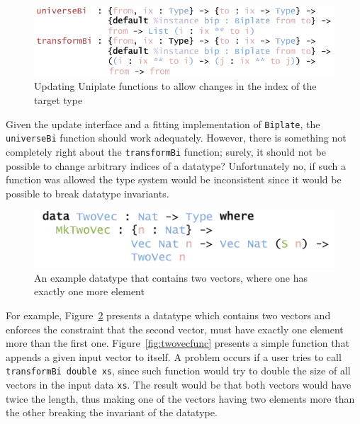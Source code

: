 \documentclass{ituthesis}
\newcommand{\tttype}[1]{\textcolor{type-color}{\texttt{#1}}}
\newcommand{\ttdec}[1]{\textcolor{declared-var-color}{\texttt{#1}}}
\newcommand{\ttvar}[1]{\textcolor{local-var-color}{\texttt{#1}}}
\theoremstyle{break}
\begin{document}
\begin{figure}[ht]
\begin{center}
    \includegraphics[scale=0.5]{Figures/UniplateFunctionsImproved.png}
\end{center}
\caption{Updating Uniplate functions to allow changes in the index of the target type}
\label{fig:uniplatefuncimp}
\end{figure}

Given the update interface and a fitting implementation of \tttype{Biplate}, the \ttdec{universeBi} function should work adequately.
However, there is something not completely right about the \ttdec{transformBi} function; surely, it should not be possible to change arbitrary indices of a datatype?
Unfortunately no, if such a function was allowed the type system would be inconsistent since it would be possible to break datatype invariants.

\begin{figure}[ht]
\begin{center}
    \includegraphics[scale=0.5]{Figures/UniplateTransformCounterProof.png}
\end{center}
\caption{An example datatype that contains two vectors, where one has exactly one more element}
\label{fig:twovec}
\end{figure}

For example, Figure~\ref{fig:twovec} presents a datatype which contains two vectors and enforces the constraint that the second vector, must have exactly one element more than the first one.
Figure~\ref{fig:twovecfunc} presents a simple function that appends a given input vector to itself.
A problem occurs if a user tries to call \ttdec{transformBi}~\ttdec{double}~\ttvar{xs}, since such function would try to double the size of all vectors in the input data \ttvar{xs}.
The result would be that both vectors would have twice the length, thus making one of the vectors having two elements more than the other breaking the invariant of the datatype.
\end{document}
